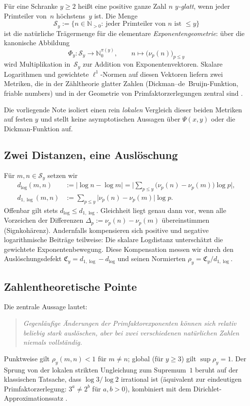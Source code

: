 \documentclass[11pt,a4paper]{article}
\theoremstyle{definition}
\newcommand{\N}{\mathbb{N}}
\newcommand{\Sy}{\mathcal{S}_y}
\newcommand{\nuP}{\nu}
\newcommand{\dlog}{d_{\log}}
\newcommand{\dlogone}{d_{1,\log}}
\newcommand{\Cy}{\mathfrak{C}_y}
\newcommand{\rhoy}{\rho_y}
\begin{document}
	F{\"u}r eine Schranke $y\ge 2$ hei{\ss}t eine positive ganze Zahl $n$
	\emph{$y$-glatt}, wenn jeder Primteiler von~$n$ h{\"o}chstens~$y$ ist.
	Die Menge
	\[
	\Sy
	:=
	\{n\in\N_{>0}:\ \text{jeder Primteiler von }n\text{ ist }\le y\}
	\]
	ist die nat{\"u}rliche Tr{\"a}germenge f{\"u}r die elementare
	\emph{Exponentengeometrie}: {\"u}ber die kanonische Abbildung
	\[
	\Phi_y:\Sy\to\N_0^{\pi(y)},
	\qquad
	n\mapsto\bigl(\nuP_p(n)\bigr)_{p\le y}
	\]
	wird Multiplikation in~$\Sy$ zur Addition von Exponentenvektoren.
	Skalare Logarithmen und gewichtete $\ell^1$-Normen auf diesen Vektoren
	liefern zwei Metriken, die in der Z{\"a}hltheorie glatter Zahlen
	(Dickman--de~Bruijn-Funktion, friable numbers) und in der
	Geometrie von Primfaktorzerlegungen zentral sind
	\cite{tenenbaum1995,hildebrand-tenenbaum1993,granville2008}.
	
	Die vorliegende Note isoliert einen rein \emph{lokalen} Vergleich dieser
	beiden Metriken auf festen $y$ und stellt keine asymptotischen
	Aussagen {\"u}ber $\Psi(x,y)$ oder die Dickman-Funktion auf.
	
	\subsection{Zwei Distanzen, eine Ausl{\"o}schung}
	
	F{\"u}r $m,n\in\Sy$ setzen wir
	\begin{align}
		\label{eq:dlog}
		\dlog(m,n)
		&:=
		\bigl\lvert\log n-\log m\bigr\rvert
		=
		\biggl\lvert\sum_{p\le y}\bigl(\nuP_p(n)-\nuP_p(m)\bigr)\log p\biggr\rvert,
		\\
		\label{eq:d1log}
		\dlogone(m,n)
		&:=
		\sum_{p\le y}
		\bigl\lvert\nuP_p(n)-\nuP_p(m)\bigr\rvert\log p.
	\end{align}
	Offenbar gilt stets $\dlog\le\dlogone$. Gleichheit liegt genau dann vor,
	wenn alle Vorzeichen der Differenzen $\Delta_p:=\nuP_p(n)-\nuP_p(m)$
	{\"u}bereinstimmen (Signkoh{\"a}renz). Andernfalls kompensieren sich
	positive und negative logarithmische Beitr{\"a}ge teilweise: Die skalare
	Logdistanz untersch{\"a}tzt die gewichtete Exponentenbewegung.
	Diese Kompensation messen wir durch den Ausl{\"o}schungsdefekt
	$\Cy=\dlogone-\dlog$ und seinen Normierten $\rhoy=\Cy/\dlogone$.
	
	\subsection{Zahlentheoretische Pointe}
	
	Die zentrale Aussage lautet:
	\begin{quote}
		\emph{Gegenl{\"a}ufige {\"A}nderungen der Primfaktorexponenten k{\"o}nnen sich
			relativ beliebig stark ausl{\"o}schen, aber bei zwei verschiedenen
			nat{\"u}rlichen Zahlen niemals vollst{\"a}ndig.}
	\end{quote}
	Punktweise gilt $\rhoy(m,n)<1$ f{\"u}r $m\neq n$; global (f{\"u}r $y\ge 3$)
	gilt $\sup\rhoy=1$. Der Sprung von der lokalen strikten Ungleichung zum
	Supremum~$1$ beruht auf der klassischen Tatsache, dass
	$\log 3/\log 2$ irrational ist
	({\"a}quivalent zur eindeutigen Primfaktorzerlegung:
	$3^a\neq 2^b$ f{\"u}r $a,b>0$), kombiniert mit dem
	Dirichlet-Approximationssatz
	\cite{cassels1957,schmidt1980}.
	
\end{document}
